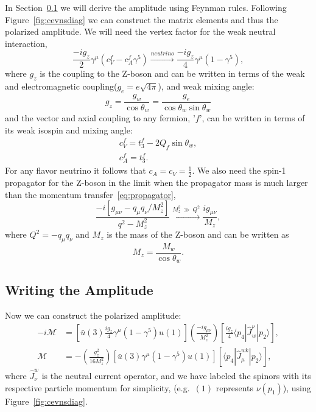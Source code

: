 In Section~\ref{sec:amplitude} we will derive the amplitude using Feynman rules. Following Figure~\ref{fig:cevnsdiag} we can construct the matrix elements and thus the polarized amplitude. We will need the vertex factor for the weak neutral interaction,
\begin{equation}
\frac{-ig_{z}}{2}\gamma ^{\mu}(c_{V}^{f}-c_{A}^{f}\gamma ^{5}) \xrightarrow{neutrino} \frac{-ig_z}{4}\gamma ^{\mu}(1-\gamma ^{5}), \label{eq:vertex} 
\end{equation}
where $g_z$ is the coupling to the Z-boson and can be written in terms of the weak and electromagnetic coupling($g_e = e\sqrt{4\pi}$),  and weak mixing angle:
\begin{equation}\label{eq:zcoupling}
g_z = \frac{g_w}{\cos \theta _w}=\frac{g_e}{\cos \theta _w \sin \theta _w}
\end{equation}
and the vector and axial coupling to any fermion, '$f$', can be written in terms of its weak isospin and mixing angle:
\begin{gather}
c_V^f=t_3^f-2Q_f\sin \theta _w, \\
c_A^f=t_3^f.
\end{gather}
For any flavor neutrino it follows that $c_{A}=c_{V}=\frac{1}{2}$. We also need the spin-1 propagator for the Z-boson in the limit when the propagator mass is much larger than the momentum transfer~\eqref{eq:propagator},
\begin{equation}
\frac{-i[g_{\mu \nu}-q_{\mu}q_{\nu}/M_{z}^{2}]}{q^2-M_{z}^{2}}\xrightarrow{M_{z}^2\ \gg \ Q^2} \frac{i g_{\mu \nu}}{M_z},\label{eq:propagator}
\end{equation}
where $Q^2=- q_{\mu} q_{\nu}$ and $M_z$ is the mass of the Z-boson and can be written as 
\begin{equation}\label{eq:zmass}
M_z = \frac{M_w}{\cos \theta _w}.
\end{equation}

\subsection{Writing the Amplitude}
\label{sec:amplitude}
Now we can construct the polarized amplitude:%
\begin{align}
-i\mathcal{M} &= \left[ \bar{u}(3)\frac{ig_{z}}{4}\gamma ^{\mu}(1-\gamma ^{5})u(1)\right] \left( \frac{-ig_{\mu \nu }}{M_{z}^{2}}\right) \left[ \frac{ig_{z}}{4}\langle p_4|\hat{J}^{\nu}_{w}|p_2 \rangle \right], \nonumber \\
\mathcal{M} &= -\left( \frac{g_{z}^{2}}{16 M_{z}^{2}}\right) [\bar{u}(3)\gamma ^{\mu}(1-\gamma ^{5})u(1)][\langle p_4|\hat{J}_{\mu}^{wk}|p_2 \rangle],
\label{eq:unpolarized}
\end{align} 
where $\hat{J}_{\nu}^{w}$ is the neutral current operator, and we have labeled the spinors with its respective particle momentum for simplicity, (e.g.\ $(1)$ represents $\nu (p_1)$), using Figure~\ref{fig:cevnsdiag}. 

